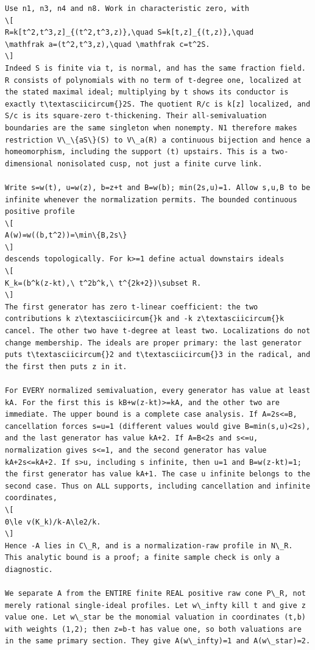 \documentclass[11pt]{article}
\begin{document}
\begin{Verbatim}[breaklines,fontsize=\tiny]
Use n1, n3, n4 and n8. Work in characteristic zero, with
\[
R=k[t^2,t^3,z]_{(t^2,t^3,z)},\quad S=k[t,z]_{(t,z)},\quad
\mathfrak a=(t^2,t^3,z),\quad \mathfrak c=t^2S.
\]
Indeed S is finite via t, is normal, and has the same fraction field. R consists of polynomials with no term of t-degree one, localized at the stated maximal ideal; multiplying by t shows its conductor is exactly t\textasciicircum{}2S. The quotient R/c is k[z] localized, and S/c is its square-zero t-thickening. Their all-semivaluation boundaries are the same singleton when nonempty. N1 therefore makes restriction V\_\{aS\}(S) to V\_a(R) a continuous bijection and hence a homeomorphism, including the support (t) upstairs. This is a two-dimensional nonisolated cusp, not just a finite curve link.

Write s=w(t), u=w(z), b=z+t and B=w(b); min(2s,u)=1. Allow s,u,B to be infinite whenever the normalization permits. The bounded continuous positive profile
\[
A(w)=w((b,t^2))=\min\{B,2s\}
\]
descends topologically. For k>=1 define actual downstairs ideals
\[
K_k=(b^k(z-kt),\ t^2b^k,\ t^{2k+2})\subset R.
\]
The first generator has zero t-linear coefficient: the two contributions k z\textasciicircum{}k and -k z\textasciicircum{}k cancel. The other two have t-degree at least two. Localizations do not change membership. The ideals are proper primary: the last generator puts t\textasciicircum{}2 and t\textasciicircum{}3 in the radical, and the first then puts z in it.

For EVERY normalized semivaluation, every generator has value at least kA. For the first this is kB+w(z-kt)>=kA, and the other two are immediate. The upper bound is a complete case analysis. If A=2s<=B, cancellation forces s=u=1 (different values would give B=min(s,u)<2s), and the last generator has value kA+2. If A=B<2s and s<=u, normalization gives s<=1, and the second generator has value kA+2s<=kA+2. If s>u, including s infinite, then u=1 and B=w(z-kt)=1; the first generator has value kA+1. The case u infinite belongs to the second case. Thus on ALL supports, including cancellation and infinite coordinates,
\[
0\le v(K_k)/k-A\le2/k.
\]
Hence -A lies in C\_R, and is a normalization-raw profile in N\_R. This analytic bound is a proof; a finite sample check is only a diagnostic.

We separate A from the ENTIRE finite REAL positive raw cone P\_R, not merely rational single-ideal profiles. Let w\_infty kill t and give z value one. Let w\_star be the monomial valuation in coordinates (t,b) with weights (1,2); then z=b-t has value one, so both valuations are in the same primary section. They give A(w\_infty)=1 and A(w\_star)=2.


\end{Verbatim}
\end{document}
